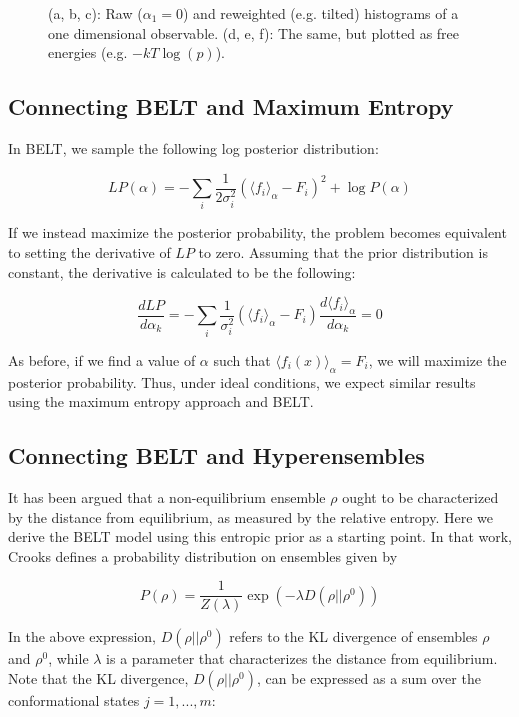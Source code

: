 \documentclass[12pt]{article}
\begin{document}
\begin{figure}
\caption{
(a, b, c): Raw ($\alpha_1 = 0$) and reweighted (e.g. tilted) histograms of a one dimensional observable.  (d, e, f): The same, but plotted as free energies (e.g. $-kT \log(p)$).  
}
\label{figure:Hist}
\end{figure}



\subsection*{Connecting BELT and Maximum Entropy}


In BELT, we sample the following log posterior distribution:

$$LP(\alpha) = -\sum_i \frac{1}{2\sigma_i^2}(\langle f_i\rangle _\alpha - F_i)^2 + \log P(\alpha)$$

If we instead maximize the posterior probability, the problem becomes equivalent to setting the derivative of $LP$ to zero.  Assuming that the prior distribution is constant, the derivative is calculated to be the following:

$$ \frac{dLP}{d\alpha_k} =  -\sum_i \frac{1}{\sigma_i^2} (\langle f_i\rangle _\alpha - F_i) \frac{d\langle f_i\rangle _\alpha}{d\alpha_k} = 0$$

As before, if we find a value of $\alpha$ such that $\langle f_i(x) \rangle_\alpha = F_i$, we will maximize the posterior probability.  Thus, under ideal conditions, we expect similar results using the maximum entropy approach and BELT.  

\subsection*{Connecting BELT and Hyperensembles}

It has been argued \cite{crooks2007beyond} that a non-equilibrium ensemble $\rho$ ought to be characterized by the distance from equilibrium, as measured by the relative entropy.  Here we derive the BELT model using this entropic prior as a starting point.  In that work, Crooks defines a probability distribution on ensembles given by 

$$P(\rho) = \frac{1}{Z(\lambda)} \exp(- \lambda D(\rho || \rho^0))$$

In the above expression, $D(\rho || \rho^0)$ refers to the KL divergence of ensembles $\rho$ and $\rho^0$, while $\lambda$ is a parameter that characterizes the distance from equilibrium.  Note that the KL divergence, $D(\rho || \rho^0)$, can be expressed as a sum over the conformational states $j = 1, ..., m$:
\end{document}
